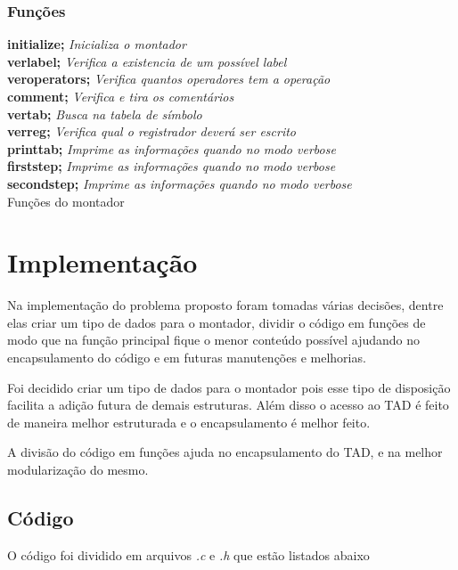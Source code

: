 \documentclass[12pt]{article}
\begin{document}
\newpage

\subsubsection{Funções}
\begin{algorithm}[h!]
\begin{footnotesize}
   \textbf{initialize;} \textit{Inicializa o montador} \\
   \textbf{verlabel;} \textit{Verifica a existencia de um possível label} \\
   \textbf{veroperators;} \textit{Verifica quantos operadores tem a operação} \\
   \textbf{comment;} \textit{Verifica e tira os comentários} \\
   \textbf{vertab;} \textit{Busca na tabela de símbolo} \\
   \textbf{verreg;} \textit{Verifica qual o registrador deverá ser escrito} \\
   \textbf{printtab;} \textit{Imprime as informações quando no modo verbose} \\
   \textbf{firststep;} \textit{Imprime as informações quando no modo verbose} \\
   \textbf{secondstep;} \textit{Imprime as informações quando no modo verbose} \\
\caption{Funções do montador}
\end{footnotesize}
\end{algorithm}


\section{Implementação}
\label{implementacao}
Na implementação do problema proposto foram tomadas várias decisões, dentre
elas criar um tipo de dados para o montador, dividir o código em funções
de modo que na função principal fique o menor conteúdo possível ajudando no
encapsulamento do código e em futuras manutenções e melhorias.

Foi decidido criar um tipo de dados para o montador pois esse tipo de
disposição facilita a adição futura de demais estruturas.
Além disso o acesso ao TAD é feito de maneira melhor estruturada e o
encapsulamento é melhor feito.

A divisão do código em funções ajuda no encapsulamento do TAD, e na melhor
modularização do mesmo.

\subsection{Código}
O código foi dividido em arquivos \textit{.c} e \textit{.h} que estão listados
abaixo
\end{document}
